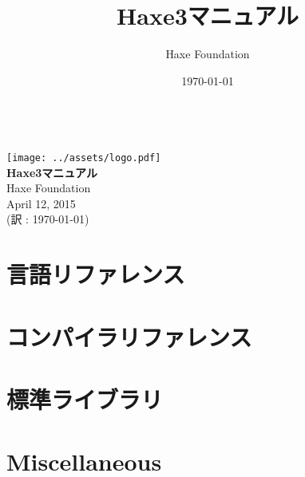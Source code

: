 \documentclass{../haxe}
\renewcommand{\maketitle}{
   \begin{titlepage}
     \setcounter{page}{-1}
			\begin{center}
				~\\[3cm]
				\texttt{[image: ../assets/logo.pdf]}~\\[1cm]
				{\huge \bfseries Haxe3マニュアル}\\[7cm]
				Haxe Foundation\\
				April 12, 2015\\
				(訳 : \today)
			\end{center}
   \end{titlepage}
}
\begin{document}
\title{Haxe3マニュアル}
\author{Haxe Foundation}
\date{\today}
\maketitle


\clearpage
\todototoc
\listoftodos
\clearpage

\clearpage
\tableofcontents
\clearpage



\part{言語リファレンス}






\part{コンパイラリファレンス}




\part{標準ライブラリ}


\part{Miscellaneous}


\end{document}

